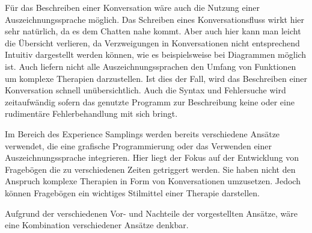 Für das Beschreiben einer Konversation wäre auch die Nutzung einer Auszeichnungssprache möglich. Das Schreiben eines Konversationsfluss wirkt hier sehr natürlich, da es dem Chatten nahe kommt. Aber auch hier kann man leicht die Übersicht verlieren, da Verzweigungen in Konversationen nicht entsprechend Intuitiv dargestellt werden können, wie es beispielsweise bei Diagrammen möglich ist. Auch liefern nicht alle Auszeichnungssprachen den Umfang von Funktionen um komplexe Therapien darzustellen. Ist dies der Fall, wird das Beschreiben einer Konversation schnell unübersichtlich. Auch die Syntax und Fehlersuche wird zeitaufwändig sofern das genutzte Programm zur Beschreibung keine oder eine rudimentäre Fehlerbehandlung mit sich bringt.  

Im Bereich des Experience Samplings werden bereits verschiedene Ansätze verwendet, die eine grafische Programmierung oder das Verwenden einer Auszeichnungssprache integrieren. Hier liegt der Fokus auf der Entwicklung von Fragebögen die zu verschiedenen Zeiten getriggert werden. Sie haben nicht den Anspruch komplexe Therapien in Form von Konversationen umzusetzen. Jedoch können Fragebögen ein wichtiges Stilmittel einer Therapie darstellen. 

Aufgrund der verschiedenen Vor- und Nachteile der vorgestellten Ansätze, wäre eine Kombination verschiedener Ansätze denkbar. 

